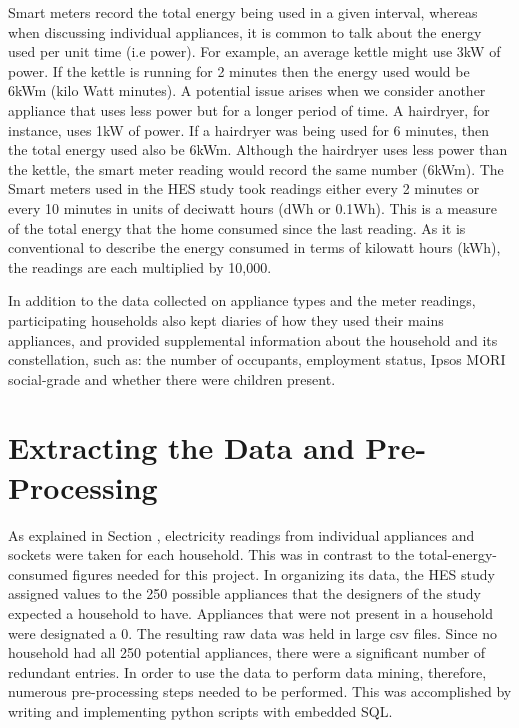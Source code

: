 Smart meters record the total energy being used in a given interval, whereas when discussing individual appliances, it is common to talk about the energy used per unit time (i.e power). For example, an average kettle might use 3kW of power. If the kettle is running for 2 minutes then the energy used would be 6kWm (kilo Watt minutes). A potential issue arises when we consider another appliance that uses less power but for a longer period of time. A hairdryer, for instance, uses 1kW of power. If a hairdryer was being used for 6 minutes, then the total energy used also be 6kWm. Although the hairdryer uses less power than the kettle, the smart meter reading would record the same number (6kWm).   The Smart meters used in the HES study took readings either every 2 minutes or every 10 minutes in units of deciwatt hours (dWh or 0.1Wh). This is a measure of the total energy that the home consumed since the last reading. As it is conventional to describe the energy consumed in terms of kilowatt hours (kWh), the readings are each multiplied by 10,000.

In addition to the data collected on appliance types and the meter readings, participating households also kept diaries of how they used their mains appliances, and provided supplemental information about the household and its constellation, such as: the number of occupants, employment status, Ipsos MORI social-grade and whether there were children present.


\section{Extracting the Data and Pre-Processing}
\label{sec:preprocessing}

As explained in Section \mentionOfAggregationSection, electricity readings from individual appliances and sockets were taken for each household.  This was in contrast to the total-energy-consumed figures needed for this project. In organizing its data, the HES study assigned values to the 250 possible appliances that the designers of the study expected a household to have.  Appliances that were not present in a household were designated a 0.  The resulting raw data was held in large csv files.  Since no household had all 250 potential appliances, there were a significant number of redundant entries. In order to use the data to perform data mining, therefore, numerous pre-processing steps needed to be performed.  This was accomplished by writing and implementing python scripts with embedded SQL.

